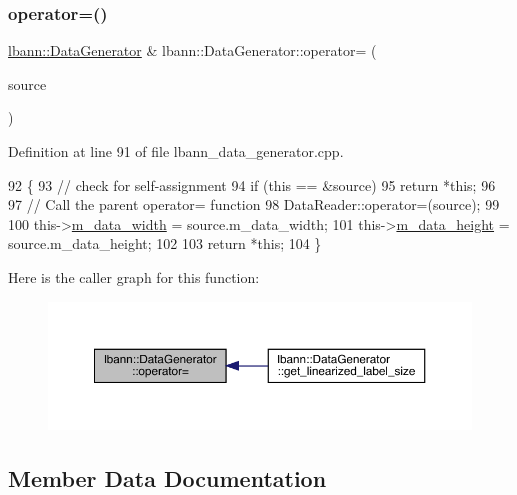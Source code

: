 \subsubsection{\texorpdfstring{operator=()}{operator=()}}
{\footnotesize\ttfamily \hyperlink{classlbann_1_1DataGenerator}{lbann\+::\+Data\+Generator} \& lbann\+::\+Data\+Generator\+::operator= (\begin{DoxyParamCaption}\item[{const \hyperlink{classlbann_1_1DataGenerator}{Data\+Generator} \&}]{source }\end{DoxyParamCaption})}



Definition at line 91 of file lbann\+\_\+data\+\_\+generator.\+cpp.


\begin{DoxyCode}
92 \{
93   \textcolor{comment}{// check for self-assignment}
94   \textcolor{keywordflow}{if} (\textcolor{keyword}{this} == &source)
95     \textcolor{keywordflow}{return} *\textcolor{keyword}{this};
96 
97   \textcolor{comment}{// Call the parent operator= function}
98   DataReader::operator=(source);
99 
100   this->\hyperlink{classlbann_1_1DataGenerator_a054cb6ab0d93ec57419a81734ddf04aa}{m\_data\_width} = source.m\_data\_width;
101   this->\hyperlink{classlbann_1_1DataGenerator_a676e679d18eb0523be714345205c662d}{m\_data\_height} = source.m\_data\_height;
102 
103   \textcolor{keywordflow}{return} *\textcolor{keyword}{this};
104 \}
\end{DoxyCode}
Here is the caller graph for this function\+:\nopagebreak
\begin{figure}[H]
\begin{center}
\leavevmode
\includegraphics[width=350pt]{classlbann_1_1DataGenerator_a0feafc772df2e0923bea06d4d6065bc3_icgraph}
\end{center}
\end{figure}


\subsection{Member Data Documentation}
\mbox{\label{classlbann_1_1DataGenerator_a6e14ec2aa2b20ca3dbb72eddd1c5fad8}} 
